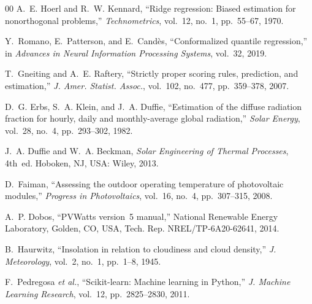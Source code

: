 \documentclass[conference]{IEEEtran}
\begin{document}
\begin{thebibliography}{00}
 A.~E. Hoerl and R.~W. Kennard, ``Ridge regression:
Biased estimation for nonorthogonal problems,'' \emph{Technometrics},
vol.~12, no.~1, pp.~55--67, 1970.

 Y.~Romano, E.~Patterson, and E.~Cand\`{e}s,
``Conformalized quantile regression,'' in \emph{Advances in Neural
Information Processing Systems}, vol.~32, 2019.

 T.~Gneiting and A.~E. Raftery, ``Strictly
proper scoring rules, prediction, and estimation,'' \emph{J. Amer.
Statist. Assoc.}, vol.~102, no.~477, pp.~359--378, 2007.

 D.~G. Erbs, S.~A. Klein, and J.~A. Duffie,
``Estimation of the diffuse radiation fraction for hourly, daily and
monthly-average global radiation,'' \emph{Solar Energy}, vol.~28,
no.~4, pp.~293--302, 1982.

 J.~A. Duffie and W.~A. Beckman, \emph{Solar
Engineering of Thermal Processes}, 4th~ed. Hoboken, NJ, USA: Wiley,
2013.

 D.~Faiman, ``Assessing the outdoor operating
temperature of photovoltaic modules,'' \emph{Progress in
Photovoltaics}, vol.~16, no.~4, pp.~307--315, 2008.

 A.~P. Dobos, ``PVWatts version~5 manual,''
National Renewable Energy Laboratory, Golden, CO, USA, Tech. Rep.
NREL/TP-6A20-62641, 2014.

 B.~Haurwitz, ``Insolation in relation to
cloudiness and cloud density,'' \emph{J. Meteorology}, vol.~2, no.~1,
pp.~1--8, 1945.

 F.~Pedregosa \emph{et al.}, ``Scikit-learn:
Machine learning in Python,'' \emph{J. Machine Learning Research},
vol.~12, pp.~2825--2830, 2011.

\end{thebibliography}
\end{document}

